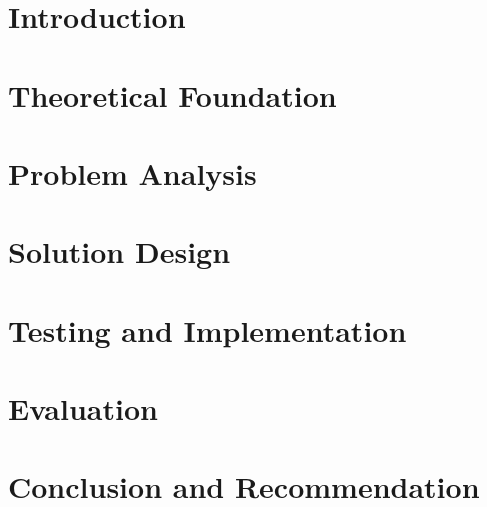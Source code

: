 \documentclass[12pt]{report}
\begin{document}

\chapter{Introduction}

\chapter{Theoretical Foundation}

\chapter{Problem Analysis}

\chapter{Solution Design}

\chapter{Testing and Implementation}

\chapter{Evaluation}

\chapter{Conclusion and Recommendation}

\end{document}
